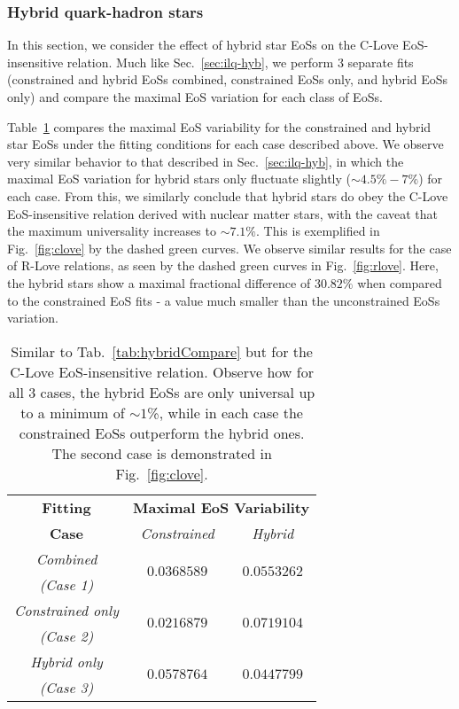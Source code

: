 \documentclass[prd,twocolumn,nofootinbib,superscriptaddress,amsmath,amssymb]{revtex4-1}
\begin{document}
\subsubsection{Hybrid quark-hadron stars}\label{sec:clove-hyb}
In this section, we consider the effect of hybrid star EoSs on the C-Love EoS-insensitive relation.
Much like Sec.~\ref{sec:ilq-hyb}, we perform 3 separate fits (constrained and hybrid EoSs combined, constrained EoSs only, and hybrid EoSs only) and compare the maximal EoS variation for each class of EoSs.

Table~\ref{tab:hybridCompareClove} compares the maximal EoS variability for the constrained and hybrid star EoSs under the fitting conditions for each case described above. 
We observe very similar behavior to that described in Sec.~\ref{sec:ilq-hyb}, in which the maximal EoS variation for hybrid stars only fluctuate slightly ($\sim 4.5\% - 7\%$) for each case.
From this, we similarly conclude that hybrid stars do obey the C-Love EoS-insensitive relation derived with nuclear matter stars, with the caveat that the maximum universality increases to $\sim 7.1\%$.
This is exemplified in Fig.~\ref{fig:clove} by the dashed green curves.
We observe similar results for the case of R-Love relations, as seen by the dashed green curves in Fig.~\ref{fig:rlove}.
Here, the hybrid stars show a maximal fractional difference of $30.82\%$ when compared to the constrained EoS fits - a value much smaller than the unconstrained EoSs variation.

\begin{table}
\centering
\caption{
Similar to Tab.~\ref{tab:hybridCompare} but for the C-Love EoS-insensitive relation.
Observe how for all 3 cases, the hybrid EoSs are only universal up to a minimum of $\sim1$\%, while in each case the constrained EoSs outperform the hybrid ones.
The second case is demonstrated in Fig.~\ref{fig:clove}.
}\label{tab:hybridCompareClove}
\begin{tabular}{ c  || c c } 
 \hline
 \hline
 \textbf{Fitting} & \multicolumn{2}{c}{\textbf{Maximal EoS Variability}} \\
 \cline{2-3}
 \textbf{Case} &  \multicolumn{1}{c|}{\emph{Constrained}} & \emph{Hybrid}\\
 \hline
 \emph{Combined} &  \multirow{2}{*}{$0.0368589$} & \multirow{2}{*}{$0.0553262$}\\
 \emph{(Case 1)} & &\\
 \cline{1-1}
 \emph{Constrained only} & \multirow{2}{*}{$0.0216879$} & \multirow{2}{*}{$0.0719104$}\\
  \emph{(Case 2)} & &\\
  \cline{1-1}
 \emph{Hybrid only} & \multirow{2}{*}{$0.0578764$} & \multirow{2}{*}{$0.0447799$}\\
  \emph{(Case 3)} & &\\
  \cline{1-1}
\hline
\hline
\end{tabular}
\end{table}
\end{document}
